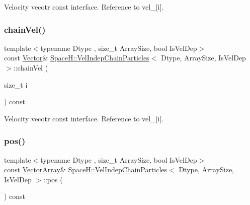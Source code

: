 Velocity vecotr const interface. Reference to vel\+\_\+\mbox{[}i\mbox{]}. 

\mbox{\label{class_space_h_1_1_vel_indep_chain_particles_a05d9529a4ee452b4c15efe92584a6d25}} 
\subsubsection{\texorpdfstring{chain\+Vel()}{chainVel()}\hspace{0.1cm}{\footnotesize\ttfamily [4/4]}}
{\footnotesize\ttfamily template$<$typename Dtype , size\+\_\+t Array\+Size, bool Is\+Vel\+Dep$>$ \\
const \mbox{\hyperlink{class_space_h_1_1_vel_indep_particles_a61bbcfdb0dc7f99f3c68af69a755c935}{Vector}}\& \mbox{\hyperlink{class_space_h_1_1_vel_indep_chain_particles}{Space\+H\+::\+Vel\+Indep\+Chain\+Particles}}$<$ Dtype, Array\+Size, Is\+Vel\+Dep $>$\+::chain\+Vel (\begin{DoxyParamCaption}\item[{size\+\_\+t}]{i }\end{DoxyParamCaption}) const\hspace{0.3cm}{\ttfamily [inline]}}



Velocity vecotr const interface. Reference to vel\+\_\+\mbox{[}i\mbox{]}. 

\mbox{\label{class_space_h_1_1_vel_indep_chain_particles_adaa5317f0c4a09c847d830de1691d156}} 
\subsubsection{\texorpdfstring{pos()}{pos()}\hspace{0.1cm}{\footnotesize\ttfamily [1/2]}}
{\footnotesize\ttfamily template$<$typename Dtype , size\+\_\+t Array\+Size, bool Is\+Vel\+Dep$>$ \\
const \mbox{\hyperlink{class_space_h_1_1_vel_indep_particles_aa9983058940249df8b00fa800e8cbad2}{Vector\+Array}}\& \mbox{\hyperlink{class_space_h_1_1_vel_indep_chain_particles}{Space\+H\+::\+Vel\+Indep\+Chain\+Particles}}$<$ Dtype, Array\+Size, Is\+Vel\+Dep $>$\+::pos (\begin{DoxyParamCaption}{ }\end{DoxyParamCaption}) const\hspace{0.3cm}{\ttfamily [inline]}}




